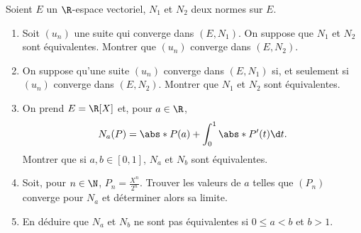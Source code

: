 \begin{enonce}
\begin{exercise}[ID={RMS135 E908},subtitle={Mines-Ponts PSI 2024},tags={oraux},difficulty={}]
Soient $E$ un $\R$-espace vectoriel, $N_1$ et $N_2$ deux normes sur $E$.
\begin{enumerate}
  \item Soit $(u_n)$ une suite qui converge dans $(E,N_1)$.
    On suppose que $N_1$ et $N_2$ sont équivalentes.
    Montrer que $(u_n)$ converge dans $(E,N_2)$.

  \item On suppose qu'une suite $(u_n)$ converge dans $(E,N_1)$ si, et seulement si $(u_n)$ converge dans $(E,N_2)$.
    Montrer que $N_1$ et $N_2$ sont équivalentes.

  \item On prend $E=\R[X]$ et, pour $a\in\R$, 
    \begin{equation*}
      N_a(P) = \abs*{P(a)} + \int_0^1 \abs*{P'(t)}\d t.
    \end{equation*}
    Montrer que si $a,b\in[0,1]$, $N_a$ et $N_b$ sont équivalentes.


  \item Soit, pour $n\in\N$, $P_n = \frac{X^n}{2^n}$.
    Trouver les valeurs de $a$ telles que $(P_n)$ converge pour $N_a$ et déterminer alors sa limite.

  \item En déduire que $N_a$ et $N_b$ ne sont pas équivalentes si $0\leq a < b$ et $b>1$.
\end{enumerate}
\end{exercise}
\begin{solution}
\end{solution}
\end{enonce}
